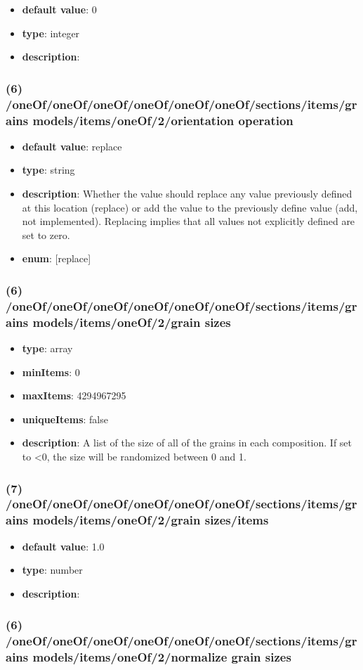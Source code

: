 \begin{itemize}[leftmargin=7em]\item {\bf default value}: 0
\item {\bf type}: integer
\item {\bf description}: 
\end{itemize}\subsubsection{(6) /oneOf/oneOf/oneOf/oneOf/oneOf/oneOf/sections/items/grains models/items/oneOf/2/orientation operation}
\begin{itemize}[leftmargin=6em]\item {\bf default value}: replace
\item {\bf type}: string
\item {\bf description}: Whether the value should replace any value previously defined at this location (replace) or add the value to the previously define value (add, not implemented). Replacing implies that all values not explicitly defined are set to zero.
\item {\bf enum}: [replace]\end{itemize}\subsubsection{(6) /oneOf/oneOf/oneOf/oneOf/oneOf/oneOf/sections/items/grains models/items/oneOf/2/grain sizes}
\begin{itemize}[leftmargin=6em]\item {\bf type}: array
\item {\bf minItems}: 0
\item {\bf maxItems}: 4294967295
\item {\bf uniqueItems}: false
\item {\bf description}: A list of the size of all of the grains in each composition. If set to <0, the size will be randomized between 0 and 1.
\end{itemize}\subsubsection{(7) /oneOf/oneOf/oneOf/oneOf/oneOf/oneOf/sections/items/grains models/items/oneOf/2/grain sizes/items}
\begin{itemize}[leftmargin=7em]\item {\bf default value}: 1.0
\item {\bf type}: number
\item {\bf description}: 
\end{itemize}\subsubsection{(6) /oneOf/oneOf/oneOf/oneOf/oneOf/oneOf/sections/items/grains models/items/oneOf/2/normalize grain sizes}
